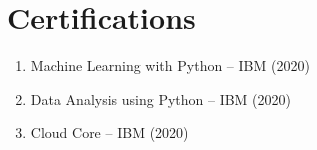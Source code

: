 \documentclass[10pt]{article} %
\begin{document}
\begin{paracol}{2}
\begin{supertabular}{rl}
\end{supertabular}


\section{Certifications}

\begin{enumerate}
    \item Machine Learning with Python -- IBM (2020)
    \item Data Analysis using Python -- IBM (2020)
    \item Cloud Core -- IBM (2020)
\end{enumerate}


\end{paracol}

\end{document}
